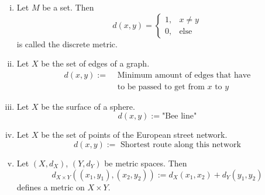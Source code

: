 \documentclass[../../script.tex] {subfiles}
\begin{document}
\begin{eg}
    \begin{enumerate}[(i)]
        \item Let $M$ be a set. Then 
        \[
            d(x, y) = \begin{cases}
                1, & x \ne y \\
                0, & \text{else}
            \end{cases}
        \]
        is called the discrete metric.

        \item Let $X$ be the set of edges of a graph.
        \begin{align*}
            d(x, y) := &\mbox{ Minimum amount of edges that have} \\
            &\mbox{ to be passed to get from } x \mbox{ to } y
        \end{align*}
        
        \begin{center}
        \end{center}

        \item Let $X$ be the surface of a sphere.
        \[
            d(x, y) := \text{"Bee line"}
        \]

        \item Let $X$ be the set of points of the European street network.
        \[
            d(x, y) := \text{ Shortest route along this network}
        \]

        \item Let $(X, d_X)$, $(Y, d_Y)$ be metric spaces. Then 
        \[
            d_{X \times Y}((x_1, y_1), (x_2, y_2)) := d_X(x_1, x_2) + d_Y(y_1, y_2)
        \]
        defines a metric on $X \times Y$.
    \end{enumerate}
\end{eg}
\end{document}
